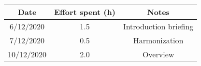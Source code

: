 \documentclass[../../main.tex]{subfiles}
\begin{document}
    \begin{center}
        \begin{tabular}{|c| |c| |c|} 
            \hline
            Date & Effort spent (h) & Notes\\ [0.5ex] 
            \hline\hline
            6/12/2020 & 1.5 & Introduction briefing\\ 
            7/12/2020 & 0.5 & Harmonization\\
            10/12/2020 & 2.0 & Overview\\
            \hline
        \end{tabular}
    \end{center}
\end{document}
